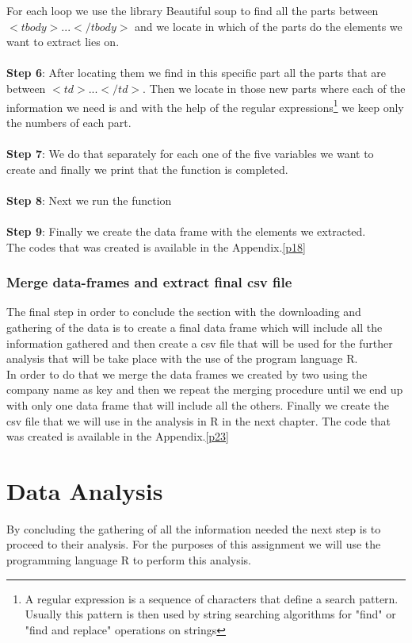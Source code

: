 \documentclass{book}
\begin{document}
For each loop we use the library Beautiful soup to find all the parts between $<tbody>...</tbody>$ and we locate in which of the parts do the elements we want to extract lies on.\\\\
\textbf{Step 6}: After locating them we find in this specific part all the parts that are between $<td>...</td>$. Then we locate in those new parts where each of the information we need is and with the help of the regular expressions\footnote{A regular expression is  a sequence of characters that define a search pattern. Usually this pattern is then used by string searching algorithms for "find" or "find and replace" operations on strings} we keep only the numbers of each part.\\\\\textbf{Step 7}: We do that separately for each one of the five variables we want to create and finally we print that the function is completed.\\\\
\textbf{Step 8}: Next we run the function\\\\
\textbf{Step 9}: Finally we create the data frame with the elements we extracted.\\
The codes that was created is available in the Appendix.\ref{p18}

\subsection{Merge data-frames and extract final csv file}
The final step in order to conclude the section with the downloading and gathering of the data is to create a final data frame which will include all the information gathered and then create a csv file that will be used for the further analysis that will be take place with the use of the program language R.\\
In order to do that we merge the data frames we created by two using the company name as key and then we repeat the merging procedure until we end up with only one data frame that will include all the others.
Finally we create the csv file that we will use in the analysis in R in the next chapter. The code that was created is available in the Appendix.\ref{p23}
 
\chapter{Data Analysis}
By concluding the gathering of all the information needed the next step is to proceed to their analysis. For the purposes of this assignment we will use the programming language R to perform this analysis.\cite{key1}
\end{document}
